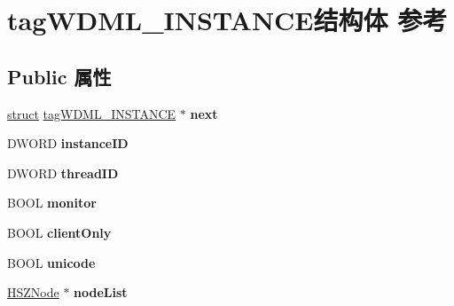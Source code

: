 \hypertarget{structtag_w_d_m_l___i_n_s_t_a_n_c_e}{}\section{tag\+W\+D\+M\+L\+\_\+\+I\+N\+S\+T\+A\+N\+C\+E结构体 参考}
\label{structtag_w_d_m_l___i_n_s_t_a_n_c_e}
\subsection*{Public 属性}
\begin{DoxyCompactItemize}
\item 
\mbox{\label{structtag_w_d_m_l___i_n_s_t_a_n_c_e_a63f143f5b6bd554a6fe3273bf2c92935}} 
\hyperlink{interfacestruct}{struct} \hyperlink{structtag_w_d_m_l___i_n_s_t_a_n_c_e}{tag\+W\+D\+M\+L\+\_\+\+I\+N\+S\+T\+A\+N\+CE} $\ast$ {\bfseries next}
\item 
\mbox{\label{structtag_w_d_m_l___i_n_s_t_a_n_c_e_a8355bab6a4b0c7b7a4f3b1e2e3b1c05a}} 
D\+W\+O\+RD {\bfseries instance\+ID}
\item 
\mbox{\label{structtag_w_d_m_l___i_n_s_t_a_n_c_e_aeedd5849a8ace771fbe4f6f209cd4082}} 
D\+W\+O\+RD {\bfseries thread\+ID}
\item 
\mbox{\label{structtag_w_d_m_l___i_n_s_t_a_n_c_e_af03d104c6a934046e5e596d55d2b54b5}} 
B\+O\+OL {\bfseries monitor}
\item 
\mbox{\label{structtag_w_d_m_l___i_n_s_t_a_n_c_e_a5bbcea9f6a593e5d21a3ffadf6af4941}} 
B\+O\+OL {\bfseries client\+Only}
\item 
\mbox{\label{structtag_w_d_m_l___i_n_s_t_a_n_c_e_a6ceaf61f341a3be4911d0fa1553f0f5b}} 
B\+O\+OL {\bfseries unicode}
\item 
\mbox{\label{structtag_w_d_m_l___i_n_s_t_a_n_c_e_a58c657456be3ec9d59e8daf4e0abd181}} 
\hyperlink{structtag_h_s_z_node}{H\+S\+Z\+Node} $\ast$ {\bfseries node\+List}
\item 

\end{DoxyCompactItemize}

